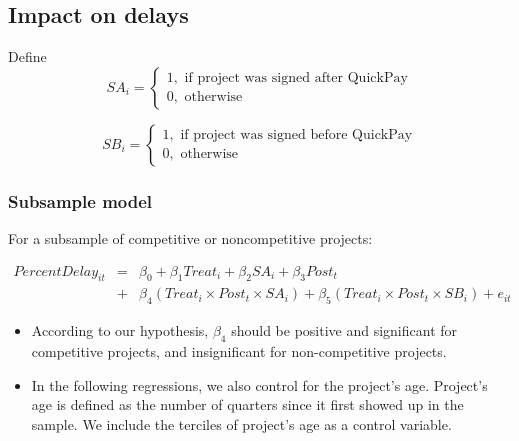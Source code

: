 \documentclass[
]{article}
\begin{document}
\hypertarget{impact-on-delays}{%
\subsection{Impact on delays}\label{impact-on-delays}}

Define
\[ SA_i = \begin{cases} 1, \text{ if project was signed after QuickPay}\\
0, \text{ otherwise} \end{cases}\]

\[ SB_i = \begin{cases} 1, \text{ if project was signed before QuickPay}\\
0, \text{ otherwise} \end{cases}\]

\hypertarget{subsample-model}{%
\subsubsection{Subsample model}\label{subsample-model}}

For a subsample of competitive or noncompetitive projects:

\[ \begin{aligned} PercentDelay_{it} &=& \beta_0 +\beta_1 Treat_i+ \beta_2 SA_i+ \beta_3 Post_t \\&+& \beta_4 (Treat_i \times Post_t \times SA_i )+\beta_5 (Treat_i \times Post_t \times SB_i )+e_{it} \end{aligned} \]

\begin{itemize}
\item
  According to our hypothesis, \(\beta_4\) should be positive and
  significant for competitive projects, and insignificant for
  non-competitive projects.
\item
  In the following regressions, we also control for the project's age.
  Project's age is defined as the number of quarters since it first
  showed up in the sample. We include the terciles of project's age as a
  control variable.
\end{itemize}
\end{document}
